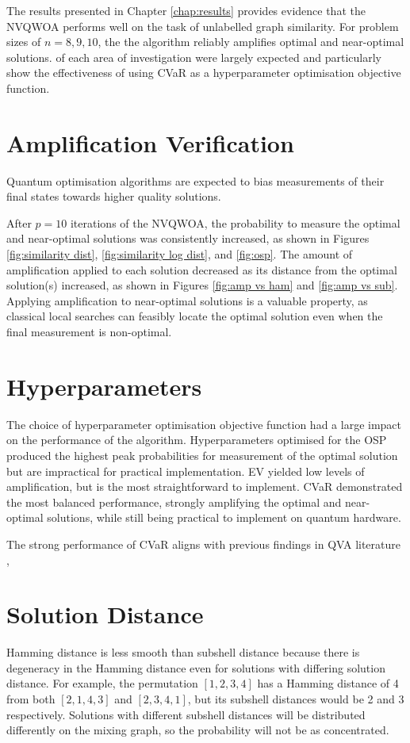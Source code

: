 The results presented in Chapter \ref{chap:results} provides evidence that the NVQWOA performs well on the task of unlabelled graph similarity. For problem sizes of $n=8,9,10$, the the algorithm reliably amplifies optimal and near-optimal solutions. of each area of investigation were largely expected and particularly show the effectiveness of using CVaR as a hyperparameter optimisation objective function.

\section{Amplification Verification}
Quantum optimisation algorithms are expected to bias measurements of their final states towards higher quality solutions.

After $p=10$ iterations of the NVQWOA, the probability to measure the optimal and near-optimal solutions was consistently increased, as shown in Figures \ref{fig:similarity dist}, \ref{fig:similarity log dist}, and \ref{fig:osp}. The amount of amplification applied to each solution decreased as its distance from the optimal solution(s) increased, as shown in Figures \ref{fig:amp vs ham} and \ref{fig:amp vs sub}. Applying amplification to near-optimal solutions is a valuable property, as classical local searches can feasibly locate the optimal solution even when the final measurement is non-optimal.

\section{Hyperparameters}
The choice of hyperparameter optimisation objective function had a large impact on the performance of the algorithm. Hyperparameters optimised for the OSP produced the highest peak probabilities for measurement of the optimal solution but are impractical for practical implementation. EV yielded low levels of amplification, but is the most straightforward to implement. CVaR demonstrated the most balanced performance, strongly amplifying the optimal and near-optimal solutions, while still being practical to implement on quantum hardware.

The strong performance of CVaR aligns with previous findings in QVA literature \cite{cvar_opt,CVaR_quantum}, 

\section{Solution Distance}
Hamming distance is less smooth than subshell distance because there is degeneracy in the Hamming distance even for solutions with differing solution distance. For example, the permutation $[1,2,3,4]$ has a Hamming distance of 4 from both $[2,1,4,3]$ and $[2,3,4,1]$, but its subshell distances would be 2 and 3 respectively. Solutions with different subshell distances will be distributed differently on the mixing graph, so the probability will not be as concentrated.


